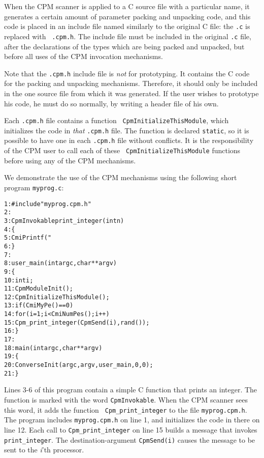 When the CPM scanner is applied to a C source file with a particular
name, it generates a certain amount of parameter packing and unpacking
code, and this code is placed in an include file named
similarly to the original C file: the {\tt .c} is replaced with {\tt
.cpm.h}.  The include file must be included in the original {\tt .c}
file, after the declarations of the types which are being packed and
unpacked, but before all uses of the CPM invocation mechanisms.

Note that the {\tt .cpm.h} include file is {\em not} for prototyping.
It contains the C code for the packing and unpacking mechanisms.
Therefore, it should only be included in the one source file from
which it was generated.  If the user wishes to prototype his code, he
must do so normally, by writing a header file of his own.

Each {\tt .cpm.h} file contains a function {\tt
CpmInitializeThisModule}, which initializes the code in {\it that}
{\tt .cpm.h} file.  The function is declared {\tt static}, so it is
possible to have one in each {\tt .cpm.h} file without conflicts.  It
is the responsibility of the CPM user to call each of these {\tt
CpmInitializeThisModule} functions before using any of the CPM
mechanisms.

We demonstrate the use of the CPM mechanisms using the following
short program {\tt myprog.c}:

\begin{alltt}
 1:    #include "myprog.cpm.h"
 2:   
 3:    CpmInvokable print_integer(int n)
 4:    \{
 5:      CmiPrintf("%d\verb+\+n", n);
 6:    \}
 7:    
 8:    user_main(int argc, char **argv)
 9:    \{
10:      int i;
11:      CpmModuleInit();
12:      CpmInitializeThisModule();
13:      if (CmiMyPe()==0)
14:        for (i=1; i<CmiNumPes(); i++)
15:          Cpm_print_integer(CpmSend(i), rand());
16:    \}
17:    
18:    main(int argc, char **argv)
19:    \{
20:      ConverseInit(argc, argv, user_main, 0, 0);
21:    \}
\end{alltt}

Lines 3-6 of this program contain a simple C function that prints an
integer.  The function is marked with the word {\tt CpmInvokable}.
When the CPM scanner sees this word, it adds the function {\tt
Cpm\_print\_integer} to the file {\tt myprog.cpm.h}.  The program
includes {\tt myprog.cpm.h} on line 1, and initializes the code in
there on line 12.  Each call to {\tt Cpm\_print\_integer} on line 15
builds a message that invokes {\tt print\_integer}.  The
destination-argument {\tt CpmSend(i)} causes the message to be sent to
the {\it i}'th processor.


